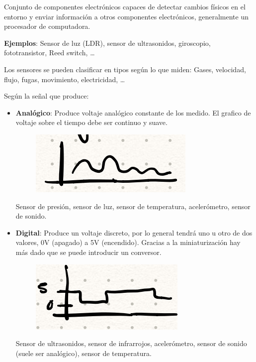 \documentclass[12pt]{report} %
\begin{document}
Conjunto de componentes electrónicos capaces de detectar cambios físicos
en el entorno y enviar información a otros componentes electrónicos,
generalmente un procesador de computadora.

\textbf{Ejemplos}: Sensor de luz (LDR), sensor de ultrasonidos,
giroscopio, fototransistor, Reed switch, \ldots{}

Los sensores se pueden clasificar en tipos según lo que miden: Gases,
velocidad, flujo, fugas, movimiento, electricidad, \ldots{}

Según la señal que produce:

\begin{itemize}

\item
  \textbf{Analógico}: Produce voltaje analógico constante de los medido.
  El grafico de voltaje sobre el tiempo debe ser continuo y suave.

\begin{figure}[H]
	{\includegraphics[scale=.5]{image-20210307210139988.png}}
\end{figure}

    Sensor de presión, sensor de luz, sensor de temperatura,
    acelerómetro, sensor de sonido.

\item
  \textbf{Digital}: Produce un voltaje discreto, por lo general tendrá
  uno u otro de dos valores, 0V (apagado) a 5V (encendido). Gracias a la
  miniaturización hay más dado que se puede introducir un conversor.

\begin{figure}[H]
	{\includegraphics[scale=.5]{image-20210307210421078.png}}
\end{figure}

    Sensor de ultrasonidos, sensor de infrarrojos, acelerómetro, sensor
    de sonido (suele ser analógico), sensor de temperatura.
\end{itemize}
\end{document}

